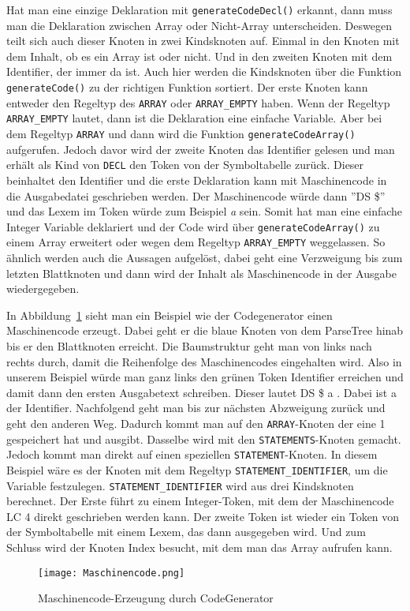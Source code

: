 

Hat man eine einzige Deklaration mit \texttt{generateCodeDecl()} erkannt, dann muss man die Deklaration zwischen Array oder  Nicht-Array unterscheiden. Deswegen teilt sich auch dieser Knoten in zwei Kindsknoten auf. Einmal in den Knoten mit dem Inhalt, ob es ein Array ist oder nicht. Und in den zweiten Knoten mit dem Identifier, der immer da ist. Auch hier werden die Kindsknoten über die Funktion \texttt{generateCode()} zu der richtigen Funktion sortiert. Der erste Knoten kann entweder den Regeltyp des \texttt{ARRAY} oder \texttt{ARRAY\_EMPTY} haben. Wenn der Regeltyp \texttt{ARRAY\_EMPTY} lautet, dann ist die Deklaration eine einfache Variable. Aber bei dem Regeltyp \texttt{ARRAY} und dann wird die Funktion \texttt{generateCodeArray()} aufgerufen. Jedoch davor wird der zweite Knoten das Identifier gelesen und man erhält als Kind von \texttt{DECL} den Token von der Symboltabelle zurück. Dieser beinhaltet den Identifier und die erste Deklaration kann mit Maschinencode in die Ausgabedatei geschrieben werden. Der Maschinencode würde dann ''DS \$'' und das Lexem im Token würde zum Beispiel \emph{a} sein. Somit hat man eine einfache Integer Variable deklariert und der Code wird über \texttt{generateCodeArray()} zu einem Array erweitert oder wegen dem Regeltyp \texttt{ARRAY\_EMPTY} weggelassen. So ähnlich werden auch die Aussagen aufgelöst, dabei geht eine Verzweigung bis zum letzten Blattknoten und dann wird der Inhalt als Maschinencode in der Ausgabe wiedergegeben.



In Abbildung~\ref{fig:codegenerator} sieht man ein Beispiel wie der Codegenerator einen Maschinencode erzeugt. Dabei geht er die blaue Knoten von dem ParseTree hinab bis er den Blattknoten erreicht. Die Baumstruktur geht man von links nach rechts durch, damit die Reihenfolge des Maschinencodes eingehalten wird. Also in unserem Beispiel würde man ganz links den grünen Token Identifier erreichen und damit dann den ersten Ausgabetext schreiben. Dieser lautet DS \$ a . Dabei ist a der Identifier. Nachfolgend geht man bis zur nächsten Abzweigung zurück und geht den anderen Weg. Dadurch kommt man auf den \texttt{ARRAY}-Knoten der eine 1 gespeichert hat und ausgibt. Dasselbe wird mit den \texttt{STATEMENTS}-Knoten gemacht. Jedoch kommt man direkt auf einen speziellen \texttt{STATEMENT}-Knoten. In diesem Beispiel wäre es der Knoten mit dem Regeltyp \texttt{STATEMENT\_IDENTIFIER}, um die Variable festzulegen. \texttt{STATEMENT\_IDENTIFIER} wird aus drei Kindsknoten berechnet. Der Erste führt zu einem Integer-Token, mit dem der Maschinencode LC 4 direkt geschrieben werden kann. Der zweite Token ist wieder ein Token von der Symboltabelle mit einem Lexem, das dann ausgegeben wird. Und zum Schluss wird der Knoten Index besucht, mit dem man das Array aufrufen kann.
\vspace{4cm}

\begin{figure}[!htb]
    \centering
      \texttt{[image: Maschinencode.png]}
    \caption{Maschinencode-Erzeugung durch CodeGenerator}\label{fig:codegenerator}
\end{figure}
